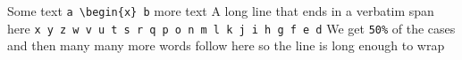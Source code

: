 Some text \verb!a \begin{x} b! more text
A long line that ends in a verbatim span here
\verb!x y z w v u t s r q p o n m l k j i h g f e d!
We get \verb=50%= of the cases and then many many more words follow
here so the line is long enough to wrap
